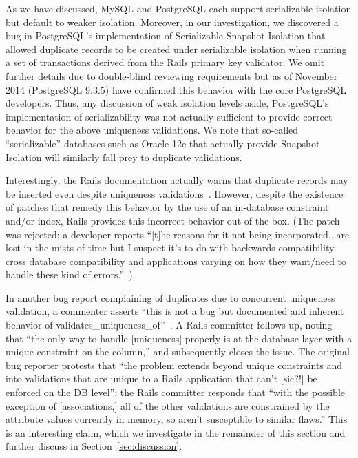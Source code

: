 As we have discussed, MySQL and PostgreSQL each support serializable
isolation but default to weaker isolation. Moreover, in our
investigation, we discovered a bug in PostgreSQL's implementation of
Serializable Snapshot Isolation that allowed duplicate records to be
created under serializable isolation when running a set of
transactions derived from the Rails primary key validator. We omit
further details due to double-blind reviewing requirements but as of
November 2014 (PostgreSQL 9.3.5) have confirmed this behavior with the
core PostgreSQL developers. Thus, any discussion of weak isolation
levels aside, PostgreSQL's implementation of serializability was not
actually sufficient to provide correct behavior for the above
uniqueness validations. We note that so-called ``serializable'' databases such
as Oracle 12c that actually provide Snapshot Isolation will similarly
fall prey to duplicate validations.

Interestingly, the Rails documentation actually warns that duplicate
records may be inserted even despite uniqueness
validations~\cite{rails-guide}. However, despite the existence of
patches that remedy this behavior by the use of an in-database
constraint and/or index, Rails provides this incorrect behavior out of
the box. (The patch was rejected; a developer reports ``[t]he reasons
for it not being incorporated...are lost in the mists of time but I
suspect it's to do with backwards compatibility, cross database
compatibility and applications varying on how they want/need to handle
these kind of errors.''~\cite{code-index-patch}).

In another bug report complaining of duplicates due to concurrent
uniqueness validation, a commenter asserts ``this is not a bug but
documented and inherent behavior of
validates\_uniqueness\_of''~\cite{code-index-error}.  A Rails
committer follows up, noting that ``the only way to handle
[uniqueness] properly is at the database layer with a unique
constraint on the column,'' and subsequently closes the issue. The
original bug reporter protests that ``the problem extends beyond
unique constraints and into validations that are unique to a Rails
application that can't [sic?!]  be enforced on the DB level''; the
Rails committer responds that ``with the possible exception of
[associations,] all of the other validations are constrained by the
attribute values currently in memory, so aren't susceptible to similar
flaws.'' This is an interesting claim, which we investigate in the
remainder of this section and further discuss in
Section~\ref{sec:discussion}.

